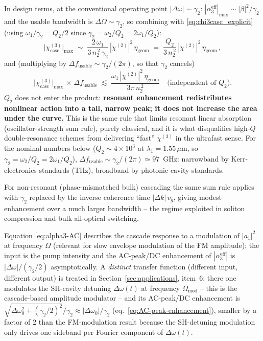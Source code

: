 \documentclass[11pt,a4paper]{article}
\newcommand{\chitwo}{\chi^{(2)}}
\newcommand{\chithree}{\chi^{(3)}}
\newcommand{\Dom}{\Delta\omega}
\begin{document}
In design terms, at the conventional operating point $|\Dom|\!\sim\!\gamma_2$:
$|\alpha_3^{\text{eff}}|_\text{max}\!\sim\!|\beta|^{2}/\gamma_2$ and
the usable bandwidth is $\Delta\Omega\!\sim\!\gamma_2$, so combining
with \eqref{eq:chi3casc_explicit} (using $\omega_1/\gamma_2 = Q_2/2$
since $\gamma_2 = \omega_2/Q_2 = 2\omega_1/Q_2$):
\begin{equation}
  \bigl|\chithree_\text{casc}\bigr|_\text{max}\;\sim\;
       \frac{2\,\omega_1}{3\,n_2^{\,2}\,\gamma_2}\,|\chitwo|^2\,\eta_\text{geom}
       \;=\;\frac{Q_2}{3\,n_2^{\,2}}\,|\chitwo|^2\,\eta_\text{geom}\,,
  \label{eq:chi3-max}
\end{equation}
and (multiplying by $\Delta f_\text{usable}\sim\gamma_2/(2\pi)$, so that
$\gamma_2$ cancels)
\begin{equation}
  \boxed{\;\bigl|\chithree_\text{casc}\bigr|_\text{max}\,\times\,\Delta f_\text{usable}
          \;\lesssim\;\frac{\omega_1\,|\chitwo|^2\,\eta_\text{geom}}{3\pi\,n_2^{\,2}}
          \quad\text{(independent of }Q_2\text{).}\;}
  \label{eq:sum-rule}
\end{equation}
$Q_2$ does not enter the product: \textbf{resonant enhancement
redistributes nonlinear action into a tall, narrow peak; it does not
increase the area under the curve.}  This is the same rule that
limits resonant linear absorption (oscillator-strength sum rule),
purely classical, and it is what disqualifies high-$Q$
double-resonance schemes from delivering ``fast'' $\chithree$ in the
ultrafast sense.  For the nominal numbers below ($Q_2\sim 4{\times}10^3$
at $\lambda_1=1.55\,\mu$m, so $\gamma_2=\omega_2/Q_2=2\omega_1/Q_2$),
$\Delta f_\text{usable}\sim\gamma_2/(2\pi)\simeq 97$~GHz: narrowband
by Kerr-electronics standards (THz), broadband by photonic-cavity
standards.

For non-resonant (phase-mismatched bulk) cascading the same sum rule
applies with $\gamma_2$ replaced by the inverse coherence time
$|\Delta k|\,v_g$, giving modest enhancement over a much larger
bandwidth -- the regime exploited in soliton compression and bulk
all-optical switching.

Equation \eqref{eq:alpha3-AC} describes the cascade response to a
modulation of $|a_1|^{2}$ at frequency $\Omega$ (relevant for slow
envelope modulation of the FM amplitude); the input is the pump
intensity and the AC-peak/DC enhancement of $|\alpha_3^\text{eff}|$ is
$|\Dom|/(\gamma_2/2)$ asymptotically.  A \emph{distinct} transfer
function (different input, different output) is treated in
Section~\ref{sec:applications}, item~6: there one modulates the
SH-cavity detuning $\Dom(t)$ at frequency $\Omega_\text{mod}$ -- this
is the cascade-based amplitude modulator -- and its AC-peak/DC
enhancement is $\sqrt{\Dom_0^{2}+(\gamma_2/2)^{2}}/\gamma_2\approx
|\Dom_0|/\gamma_2$ (eq.~\eqref{eq:AC-peak-enhancement}), smaller by a
factor of $2$ than the FM-modulation result because the SH-detuning
modulation only drives one sideband per Fourier component of $\Dom(t)$.
\end{document}
